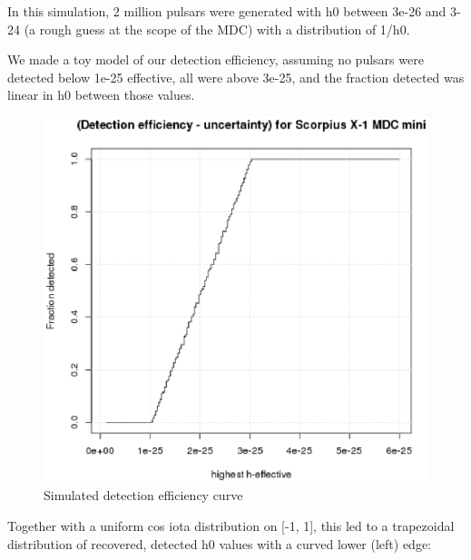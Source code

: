 In this simulation, 2 million pulsars were generated with h0 between 3e-26 and 3-24 (a rough guess at the scope of the MDC) with a distribution of 1/h0.

We made a toy model of our detection efficiency, assuming no pulsars were detected below 1e-25 effective, all were above 3e-25, and the fraction detected was linear in h0 between those values.

\begin{figure}
\begin{center}
\includegraphics[width=0.3\paperwidth,height=0.2\paperheight]{PlotHeffDistH0DetectionEfficiency200breaks.eps}
\caption{ Simulated detection efficiency curve
}
\end{center}
\end{figure}


Together with a uniform cos iota distribution on [-1, 1], this led to a trapezoidal distribution of recovered, detected h0 values with a curved lower (left) edge:

